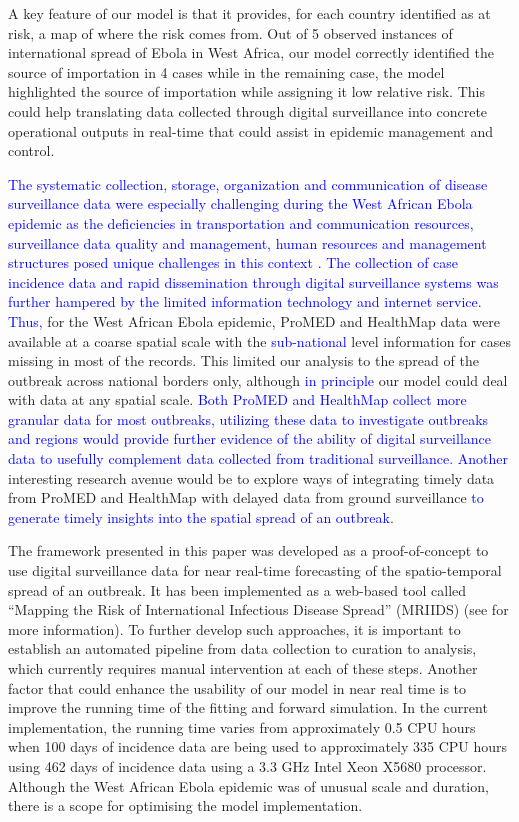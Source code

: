 \documentclass[9pt,twocolumn,twoside,lineno]{pnas-new}
\newcommand{\sangeeta}[1]{\textcolor{blue}{#1}}
\begin{document}
A key feature of our model is that it
provides, for each country identified as at risk, a map of where the
risk comes from. Out of 5 observed instances of international spread
of Ebola in West Africa, our model correctly identified the source
of importation in 4 cases while in the remaining case, the model
highlighted the source of importation while assigning it low relative
risk. This could help translating data collected through
digital surveillance into concrete operational outputs in real-time
that could assist in epidemic management and control. 

\sangeeta{The systematic collection, storage, organization and communication 
of disease surveillance data were especially challenging during the 
West African Ebola epidemic as the 
deficiencies in transportation and communication resources, 
surveillance data quality and management, human resources and 
management structures posed unique challenges in this context \cite{boland2017overcoming}.
The collection of case
incidence data and rapid dissemination through digital surveillance
systems was further hampered by the limited information technology and internet 
service. Thus, }
for the West African Ebola epidemic, ProMED and HealthMap data were
available at a coarse spatial scale with the \sangeeta{sub-national} level information
for cases missing in most of the records. This limited our analysis to
the spread of the outbreak across national borders only, although
\sangeeta{in principle} our
model could deal with data at any spatial scale. \sangeeta{Both ProMED and HealthMap
collect more granular data for most outbreaks, utilizing these data
to investigate outbreaks and regions would provide further evidence of
the ability of digital surveillance data to usefully complement data
collected from traditional
surveillance. Another}  interesting research
avenue would be to explore ways of integrating
timely data from ProMED and HealthMap with delayed data from ground
surveillance \sangeeta{ to generate timely insights into the spatial spread
of an outbreak}.

The framework presented in this paper was developed as a
proof-of-concept to use digital surveillance data for near real-time
forecasting of the spatio-temporal spread of an outbreak. It has been
implemented as a web-based tool called ``Mapping the Risk of
International Infectious Disease Spread'' (MRIIDS) (see
\cite{mriidswiki} for more information). To further develop such
approaches, it is important to establish an automated pipeline from data
collection to curation to analysis, which currently requires manual
intervention at each of these steps. Another factor that could enhance
the usability of our model in near real time is to improve the running
time of the fitting and forward simulation. In the current
implementation, the running time varies from approximately 0.5 CPU hours when
100 days of incidence data are being used to approximately 335 CPU hours
using 462 days of incidence data using a 3.3 GHz Intel Xeon X5680
processor. Although the West African Ebola epidemic was of unusual scale
and duration, there is a scope for optimising the model implementation.
\end{document}
